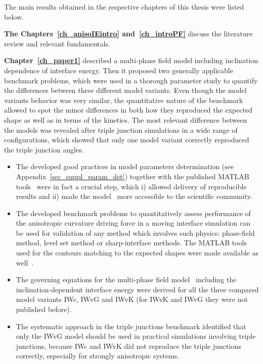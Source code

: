 The main results obtained in the respective chapters of this thesis were listed below.

\textbf{The Chapters~\ref{ch_anisoIEintro} and~\ref{ch_introPF}} discuss the literature review and relevant fundamentals.

\textbf{Chapter~\ref{ch_paper1}} described a multi-phase field model including inclination dependence of interface energy. Then it proposed two generally applicable benchmark problems, which were used in a thorough parameter study to quantify the differences between three different model variants. Even though the model variants behavior was very similar, the quantitative nature of the benchmark allowed to spot the minor differences in both how they reproduced the expected shape as well as in terms of the kinetics. The most relevant difference between the models was revealed after triple junction simulations in a wide range of configurations, which showed that only one model variant correctly reproduced the triple junction angles.
\begin{itemize}
	\item The developed good practices in model parameters determination (see Appendix~\ref{sec_suppl_param_det}) together with the published MATLAB tools~\cite{Minar2022dataset} were in fact a crucial step, which i) allowed delivery of reproducible results and ii) made the model~\cite{Moelans2008} more accessible to the scientific community.
	\item The developed benchmark problems to quantitatively assess performance of the anisotropic curvature driving force in a moving interface simulation can be used for validation of any method which involves such physics: phase-field method, level set method or sharp-interface methods. The MATLAB tools used for the contours matching to the expected shapes were made available as well~\cite{Minar2022dataset}.
	\item The governing equations for the multi-phase field model~\cite{Moelans2008} including the inclination-dependent interface energy were derived for all the three compared model variants IWc, IWvG and IWvK (for IWvK and IWvG they were not published before).
	\item The systematic approach in the triple junctions benchmark identified that only the IWvG model should be used in practical simulations involving triple junctions, because IWc and IWvK did not reproduce the triple junctions correctly, especially for strongly anisotropic systems.
\end{itemize}

